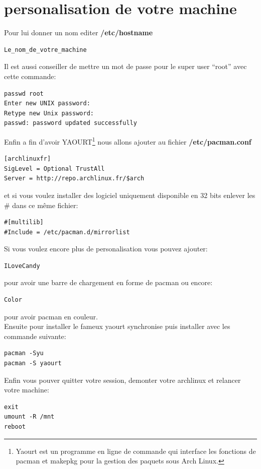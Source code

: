 \documentclass[a4paper]{book}
\begin{document}
\chapter{personalisation de votre machine}
Pour lui donner un nom editer \textbf{/etc/hostname}\\
\begin{lstlisting}
Le_nom_de_votre_machine
\end{lstlisting}
Il est aussi conseiller de mettre un mot de passe pour le super user ``root''
avec cette commande\@:\\
\begin{lstlisting}
passwd root
Enter new UNIX password:
Retype new Unix password:
passwd: password updated successfully
\end{lstlisting}
Enfin a fin d'avoir YAOURT\footnote{Yaourt est un programme en ligne de 
  commande qui interface les fonctions de pacman et makepkg pour la gestion 
des paquets sous Arch Linux.} nous allons ajouter au fichier
\textbf{/etc/pacman.conf}\\
\begin{lstlisting}
[archlinuxfr]
SigLevel = Optional TrustAll
Server = http://repo.archlinux.fr/$arch
\end{lstlisting}
et si vous voulez installer des logiciel uniquement disponible en 32 bits enlever les \#
dans ce même fichier\@:\\
\begin{lstlisting}
#[multilib]
#Include = /etc/pacman.d/mirrorlist
\end{lstlisting}
Si vous voulez encore plus de personalisation vous pouvez ajouter\@:\\
\begin{lstlisting}
ILoveCandy
\end{lstlisting}
pour avoir une barre de chargement en forme de pacman ou encore\@:\\
\begin{lstlisting}
Color
\end{lstlisting}
pour avoir pacman en couleur.\\
Ensuite pour installer le fameux yaourt synchronise puis installer avec les
commande suivante\@:\\
\begin{lstlisting}
pacman -Syu
pacman -S yaourt
\end{lstlisting}
Enfin vous pouver quitter votre session, demonter votre archlinux et relancer
votre machine\@:\\
\begin{lstlisting}
exit
umount -R /mnt
reboot
\end{lstlisting}
\end{document}
